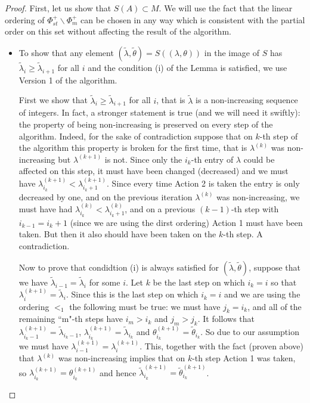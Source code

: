 \documentclass[12pt]{amsart}
\numberwithin{equation}{section}
\numberwithin{equation}{section}
\theoremstyle{definition}
\begin{document}
\begin{proof}
    First, let us show that $S(A)\subset M$. We will use the fact that the linear ordering of $\Phi^+_{st}\backslash \Phi^+_m$ can be chosen in any way which is consistent with the partial order on this set without affecting the result of the algorithm.
    \begin{itemize}
        \item To show that any element $(\tilde\lambda,\tilde\theta)=S\left( (\lambda,\theta)\right)$ in the image of $S$ has $\tilde\lambda_{i} \ge \tilde\lambda_{i+1}$ for all $i$  and the condition (i) of the Lemma is satisfied, we use Version 1 of the algorithm.

        First we show that $\tilde\lambda_{i} \ge \tilde\lambda_{i+1}$ for all $i$, that is $\tilde\lambda$ is a non-increasing sequence of integers. In fact, a stronger statement is true (and we will need it swiftly): the property of being non-increasing is preserved on every step of the algorithm. Indeed, for the sake of contradiction suppose that on $k$-th step of the algorithm this property is broken for the first time, that is $\lambda^{(k)}$ was non-increasing but $\lambda^{(k+1)}$ is not. Since only the $i_k$-th entry of $\lambda$ could be affected on this step, it must have been changed (decreased) and we must have $\lambda^{(k+1)}_{i_k}<\lambda^{(k+1)}_{i_k+1}$. Since every time Action 2 is taken the entry is only decreased by one, and on the previous iteration $\lambda^{(k)}$ was non-increasing, we must have had $\lambda^{(k)}_{i_k}<\lambda^{(k)}_{i_k+1}$, and on a previous $(k-1)$-th step with $i_{k-1}=i_k+1$ (since we are using the dirst ordering) Action 1 must have been taken. But then it also should have been taken on the $k$-th step. A contradiction.

         Now to prove that condidtion (i) is always satisfied for $(\tilde\lambda,\tilde\theta)$, suppose that we have $\tilde\lambda_{i-1} =\tilde\lambda_{i}$ for some $i$. Let $k$ be the last step on which $i_k=i$ so that $\lambda^{(k+1)}_{i}=\tilde\lambda_{i}$. Since this is the last step on which $i_k=i$ and we are using the ordering $<_1$ the following must be true: we must have $j_k=i_k$, and all of the remaining ``m"-th steps have $i_m>i_k$ and $j_m>j_k$. It follows that $\lambda_{i_k-1}^{(k+1)}= \tilde\lambda_{i_k-1}$, $\lambda_{i_k}^{(k+1)}= \tilde\lambda_{i_k}$ and $\theta_{i_k}^{(k+1)}= \tilde\theta_{i_k}$. So due to our assumption we must have $\lambda_{i-1}^{(k+1)} =\lambda_{i}^{(k+1)}$. This, together with the fact (proven above) that $\lambda^{(k)}$ was non-increasing implies that on $k$-th step Action 1 was taken, so $\lambda_{i_k}^{(k+1)}= \theta_{i_k}^{(k+1)}$ and hence $\tilde\lambda_{i_k}^{(k+1)}= \tilde\theta_{i_k}^{(k+1)}$.


\end{itemize}
\end{proof}
\end{document}
